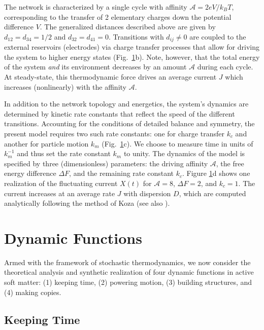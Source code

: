 \begin{appendices}
\begin{figure}[p!]
    \label{fig:KeepingTime}
\end{figure}

The network is characterized by a single cycle with affinity $\mathcal{A}= 2 e V / k_B T$, corresponding to the transfer of 2 elementary charges down the potential difference $V$. The generalized distances described above are given by $d_{12}=d_{34}=1/2$ and $d_{32}=d_{41}=0$.  Transitions with $d_{ij}\neq0$ are coupled to the external reservoirs (electrodes) via charge transfer processes that allow for driving the system to higher energy states (Fig.~\ref{fig:KeepingTime}b).  Note, however, that the total energy of the system \emph{and} its environment decreases by an amount $\mathcal{A}$ during each cycle.  At steady-state, this thermodynamic force drives an average current $J$ which increases (nonlinearly) with the affinity $\mathcal{A}$.    

In addition to the network topology and energetics, the system's dynamics are determined by kinetic rate constants that reflect the speed of the different transitions. Accounting for the conditions of detailed balance and symmetry, the present model requires two such rate constants: one for charge transfer $k_c$ and another for particle motion $k_m$ (Fig.~\ref{fig:KeepingTime}c). We choose to measure time in units of $k_m^{-1}$ and thus set the rate constant $k_m$ to unity. The dynamics of the model is specified by three (dimensionless) parameters: the driving affinity $\mathcal{A}$, the free energy difference $\Delta F$, and the remaining rate constant $k_c$.  Figure \ref{fig:KeepingTime}d shows one realization of the fluctuating current $X(t)$ for $\mathcal{A}=8$, $\Delta F=2$, and $k_c= 1$.  The current increases at an average rate $J$ with dispersion $D$, which are computed analytically following the method of Koza \autocite{koza1999general} (see also \autocite{Pietzonka2016b}).

\section{Dynamic Functions}

Armed with the framework of stochastic thermodynamics, we now consider the theoretical analysis and synthetic realization of four dynamic functions in active soft matter: (1) keeping time, (2) powering motion, (3) building structures, and (4) making copies.

\subsection{Keeping Time}


\end{appendices}
